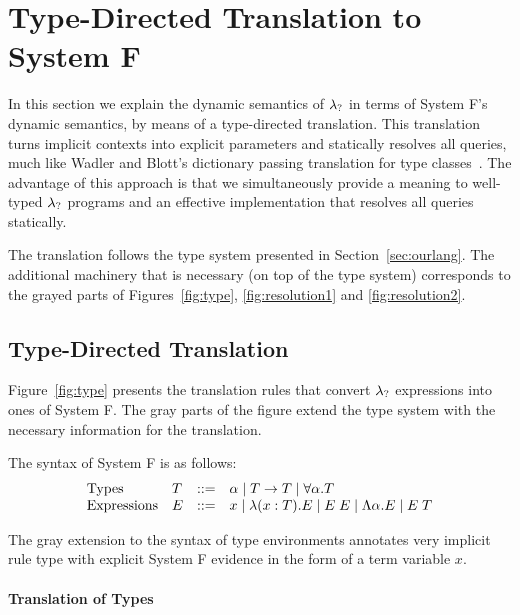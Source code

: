\section{Type-Directed Translation to System F}
\label{sec:trans}

In this section we explain the dynamic semantics of $\lambda_{?}$ in terms
of System F's dynamic semantics, by means of a type-directed translation. 
This translation turns implicit contexts into explicit parameters and
statically resolves all queries, much like Wadler and Blott's dictionary
passing translation for type classes~\cite{adhoc}. 
The advantage of this approach is that we simultaneously provide a meaning to
well-typed $\lambda_{?}$ programs and an effective implementation that resolves
all queries statically.

The translation follows the type system presented in Section~\ref{sec:ourlang}.
The additional machinery that is necessary (on top of the type system)
corresponds to the grayed parts of Figures~\ref{fig:type}, \ref{fig:resolution1} and \ref{fig:resolution2}. 

\subsection{Type-Directed Translation}
Figure~\ref{fig:type} presents the translation rules that convert $\lambda_{?}$
expressions into ones of System F. 
The gray parts of the figure extend the type system with the necessary
information for the translation.

The syntax of System F is as follows: 
{\small
  \[ \begin{array}{llrl}
    \text{Types} & T & ::= & \alpha \mid T \rightarrow T 
    \mid \forall \alpha. T \\ 
    \text{Expressions} & E & ::=  & x \mid \lambda (x:T) . E \mid E\;E
    \mid \Lambda \alpha . E \mid E\;T 
  \end{array} \]}

The gray extension to the syntax of type environments annotates very
implicit rule type with explicit System F evidence in the form of a 
term variable $x$.

\paragraph{Translation of Types}

